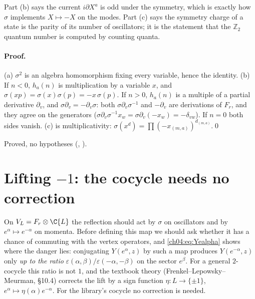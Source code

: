 \begin{physics}
Part (b) says the current $i\partial X^a$ is odd under the symmetry, which is exactly how $\sigma$ implements $X\mapsto-X$ on the modes. Part (c) says the symmetry charge of a state is the parity of its number of oscillators; it is the statement that the $\mathbb Z_2$ quantum number is computed by counting quanta.
\end{physics}

\paragraph{Proof.} (a) $\sigma^2$ is an algebra homomorphism fixing every variable, hence the
identity. (b) If $n<0$, $h_a(n)$ is multiplication by a variable $x$, and
$\sigma(xp)=\sigma(x)\sigma(p)=-x\,\sigma(p)$. If $n>0$, $h_a(n)$ is a multiple of a partial
derivative $\partial_v$, and $\sigma\partial_v=-\partial_v\sigma$: both $\sigma\partial_v\sigma^{-1}$
and $-\partial_v$ are derivations of $F_r$, and they agree on the generators
($\sigma\partial_v\sigma^{-1}x_w=\sigma\partial_v(-x_w)=-\delta_{vw}$). If $n=0$ both sides vanish.
(c) is multiplicativity: $\sigma(x^d)=\prod(-x_{(m,a)})^{d_{(m,a)}}$.\qed

\begin{status}
Proved, no hypotheses (,
).
\end{status}

\section{Lifting \texorpdfstring{$-1$}{-1}: the cocycle needs no correction}\label{ch04:sec:theta}

On $V_L=F_r\otimes\C\{L\}$ the reflection should act by $\sigma$ on oscillators and by
$e^\alpha\mapsto e^{-\alpha}$ on momenta. Before defining this map we should ask whether it has a
chance of commuting with the vertex operators, and \eqref{ch04:eq:Yealpha} shows where the danger
lies: conjugating $Y(e^\alpha,z)$ by such a map produces $Y(e^{-\alpha},z)$ only \emph{up to the
ratio} $\varepsilon(\alpha,\beta)/\varepsilon(-\alpha,-\beta)$ on the sector $e^{\beta}$. For a general
$2$-cocycle this ratio is not $1$, and the textbook theory (Frenkel--Lepowsky--Meurman, \S10.4)
corrects the lift by a sign function $\eta:L\to\{\pm1\}$, $e^\alpha\mapsto\eta(\alpha)e^{-\alpha}$. For
the library's cocycle no correction is needed.

